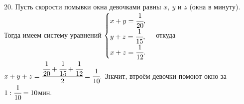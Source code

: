 20. Пусть скорости помывки окна девочками равны $x,\ y$ и $z$ (окна в минуту). Тогда имеем систему уравнений $\begin{cases} x+y=\cfrac{1}{20},\\ y+z=\cfrac{1}{15},\\ x+z=\cfrac{1}{12}.\end{cases}$ откуда $x+y+z=\cfrac{\cfrac{1}{20}+\cfrac{1}{15}+\cfrac{1}{12}}{2}=\cfrac{1}{10}.$ Значит, втроём девочки помоют окно за $1:\cfrac{1}{10}=10$мин.\\
